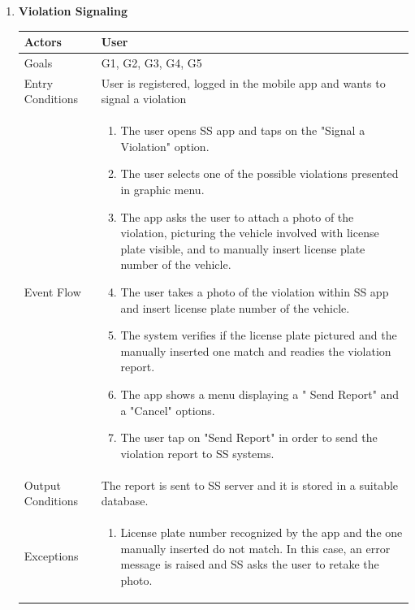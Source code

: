 \begin{enumerate}
	\item \textbf{Violation Signaling}
		\begin{table}[h!]
		\centering
		\begin{tabular}{|l|p{}|}
		\hline
		Actors            			&       	User\\ \hline
		Goals             			&         G1, G2, G3, G4, G5	\\ \hline
		Entry Conditions  	&  		User is registered, logged in the mobile app and wants to signal a violation\\ \hline
		Event Flow        		&          
				\begin{enumerate}[label=\alph*)]
					\item The user opens SS app and taps on the "Signal a Violation" option.
					\item The user selects one of the possible violations presented in graphic menu.
					\item The app asks the user to attach a photo of the violation, picturing the vehicle involved with license plate visible, and to manually insert license plate number of the vehicle.
					\item The user takes a photo of the violation within SS app and insert license plate number of the vehicle.
					\item The system verifies if the license plate pictured and the manually inserted one match and readies the violation report. 
					\item The app shows a menu displaying a " Send Report" and a "Cancel" options.
					\item The user tap on "Send Report" in order to send the violation report to SS systems.
					\end{enumerate}\\ \hline
		Output Conditions &    		The report is sent to SS server and it is stored in a suitable database.\\ \hline
		Exceptions        		&       	
				\begin{enumerate}[label=\alph*)]
					\item License plate number recognized by the app and the one manually inserted do not match. In this case, an error message is raised and SS asks the user to retake the photo.
				\end{enumerate}\\ \hline
	\end{tabular}
	\end{table}
	

\end{enumerate}
